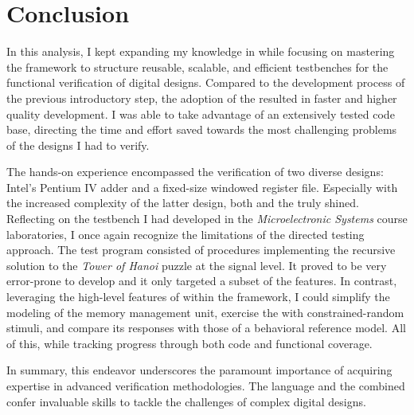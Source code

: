 \section{Conclusion}
In this analysis, I kept expanding my knowledge in \sv while focusing on mastering the \uvm framework to structure reusable, scalable, and efficient testbenches for the functional verification of digital designs. Compared to the development process of the previous introductory step, the adoption of the \uvm resulted in faster and higher quality development. I was able to take advantage of an extensively tested code base, directing the time and effort saved towards the most challenging problems of the designs I had to verify.

The hands-on experience encompassed the verification of two diverse designs: Intel's Pentium IV adder and a fixed-size windowed register file. Especially with the increased complexity of the latter design, both \sv and the \uvm truly shined. Reflecting on the testbench I had developed in the \emph{Microelectronic Systems} course laboratories, I once again recognize the limitations of the directed testing approach. The test program consisted of \vhdl procedures implementing the recursive solution to the \emph{Tower of Hanoi} puzzle at the signal level. It proved to be very error-prone to develop and it only targeted a subset of the \dut features. In contrast, leveraging the high-level features of \sv within the \uvm framework, I could simplify the modeling of the memory management unit, exercise the \dut with constrained-random stimuli, and compare its responses with those of a behavioral reference model. All of this, while tracking progress through both code and functional coverage.

In summary, this endeavor underscores the paramount importance of acquiring expertise in advanced verification methodologies. The \sv language and the \uvm combined confer invaluable skills to tackle the challenges of complex digital designs.